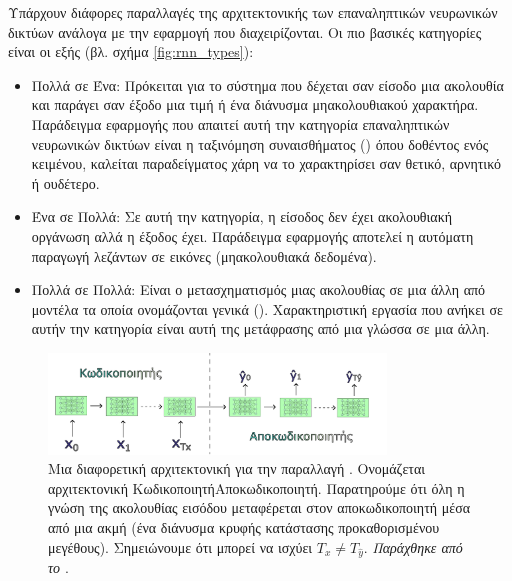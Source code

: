 Υπάρχουν διάφορες παραλλαγές της αρχιτεκτονικής των επαναληπτικών νευρωνικών δικτύων ανάλογα με την εφαρμογή που διαχειρίζονται. Οι πιο βασικές κατηγορίες είναι οι εξής (βλ. σχήμα \ref{fig:rnn_types}):
\begin{itemize}
  \item Πολλά σε Ένα: Πρόκειται για το σύστημα που δέχεται σαν είσοδο μια ακολουθία και παράγει σαν έξοδο μια τιμή ή ένα διάνυσμα μη\textendash ακολουθιακού χαρακτήρα. Παράδειγμα εφαρμογής που απαιτεί αυτή την κατηγορία επαναληπτικών νευρωνικών δικτύων είναι η ταξινόμηση συναισθήματος () όπου δοθέντος ενός κειμένου, καλείται παραδείγματος χάρη να το χαρακτηρίσει σαν θετικό, αρνητικό ή ουδέτερο.
  \item Ένα σε Πολλά: Σε αυτή την κατηγορία, η είσοδος δεν έχει ακολουθιακή οργάνωση αλλά η έξοδος έχει. Παράδειγμα εφαρμογής αποτελεί η αυτόματη παραγωγή λεζάντων σε εικόνες (μη\textendash ακολουθιακά δεδομένα).
  \item Πολλά σε Πολλά: Είναι ο μετασχηματισμός μιας ακολουθίας σε μια άλλη από μοντέλα τα οποία ονομάζονται γενικά  (). Χαρακτηριστική εργασία που ανήκει σε αυτήν την κατηγορία είναι αυτή της μετάφρασης από μια γλώσσα σε μια άλλη.
\end{itemize}\par

\begin{figure}[h]
  \centering
  \includegraphics[width=0.8\textwidth]{images/chapter theoritical background/rnn_many_to_many_encoder_decoder_gr.pdf}
  \caption{Μια διαφορετική αρχιτεκτονική για την παραλλαγή . Ονομάζεται αρχιτεκτονική Κωδικοποιητή\textendash Αποκωδικοποιητή. Παρατηρούμε ότι όλη η γνώση της ακολουθίας εισόδου μεταφέρεται στον αποκωδικοποιητή μέσα από μια ακμή (ένα διάνυσμα κρυφής κατάστασης προκαθορισμένου μεγέθους). Σημειώνουμε ότι μπορεί να ισχύει $T_x \neq T_{\hat{y}}$. \textit{Παράχθηκε από το \href{https://inkscape.org/}{}}.}
  \label{fig:rnn_enc_dec}
\end{figure}

